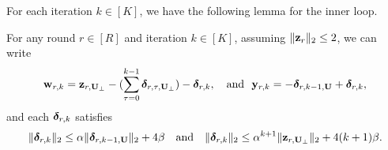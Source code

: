 For each iteration $k \in [K]$, we have the following lemma for the inner loop.
\begin{lemma}
\label{lem:inner-induction}
For any round $r\in [R]$ and iteration $k \in [K]$, assuming $\|\mathbf{z}_r\|_2 \leq 2$, we can write
\begin{align*}
\mathbf{w}_{r, k} = \mathbf{z}_{r, \mathbf{U}_{\perp}} - (\sum_{\tau = 0}^{k-1} \boldsymbol\delta_{r, \tau, \mathbf{U}_{\perp}}) - \boldsymbol\delta_{r, k}, ~~~\text{and}~~
\mathbf{y}_{r, k} = -\boldsymbol\delta_{r, k-1, \mathbf{U}} + \boldsymbol\delta_{r, k}, 
\end{align*}
and each $\boldsymbol\delta_{r, k}$ satisfies
\begin{align*}
\|\boldsymbol\delta_{r, k}\|_2 \leq \alpha \|\boldsymbol\delta_{r, k-1, \mathbf{U}}\|_2 + 4 \beta \quad \text{and} \quad \|\boldsymbol\delta_{r, k}\|_2 \leq \alpha^{k+1}\|\mathbf{z}_{r, \mathbf{U}_{\perp}}\|_2 + 4(k+1)\beta.
\end{align*}
\end{lemma}
